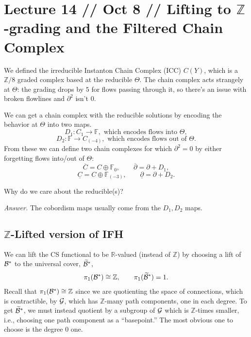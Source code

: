 \documentclass[main]{subfiles}
\begin{document}
\section*{Lecture 14 // Oct 8 // Lifting to $\mathbb{Z}$-grading and the Filtered Chain Complex}

\begin{recall}
We defined the irreducible Instanton Chain Complex (ICC) $C(Y)$, which is a $\mathbb{Z}/8$ graded complex based at the reducible $\Theta$. The chain complex acts strangely at $\Theta$: the grading drops by $5$ for flows passing through it, so there's an issue with broken flowlines and $\partial^2$ isn't $0$.

We can get a chain complex with the reducible solutions by encoding the behavior at $\Theta$ into two maps.
\[
D_1 : C_1 \to \mathbb{F}, \text{ which encodes flows into } \Theta,
\]
\[
D_2 : \mathbb{F} \to C_{(-4)}, \text{ which encodes flows out of } \Theta.
\]
From these we can define two chain complexes for which $\partial^2=0$ by either forgetting flows into/out of $\Theta$:
\[
\overline{C} = C\oplus \mathbb{F}_0, \qquad \overline{\partial} = \partial + D_1,
\]
\[
\underline{C} = C\oplus \mathbb{F}_{(-3)}, \qquad \underline{\partial} = \partial + D_2.
\]
\end{recall}

\begin{question}
Why do we care about the reducible(s)?
\end{question}
\noindent\textit{Answer.} The cobordism maps usually come from the $D_1, D_2$ maps.

\subsection*{$\mathbb{Z}$-Lifted version of IFH}

We can lift the CS functional to be $\mathbb{R}$-valued (instead of $\mathbb{Z}$) by choosing a lift of $\mathcal{B}^\ast$ to the universal cover, $\widetilde{\mathcal{B}}^\ast$,
\[
\pi_1(\mathcal{B}^\ast) \cong \mathbb{Z}, \qquad \pi_1(\widetilde{\mathcal{B}}^\ast) = 1.
\]
Recall that $\pi_1(\mathcal{B}^\ast)\cong \mathbb{Z}$ since we are quotienting the space of connections, which is contractible, by $\mathcal{G}$, which has $\mathbb{Z}$-many path components, one in each degree. To get $\widetilde{\mathcal{B}}^\ast$, we must instead quotient by a subgroup of $\mathcal{G}$ which is $\mathbb{Z}$-times smaller, i.e., choosing one path component as a ``basepoint.'' The most obvious one to choose is the degree $0$ one.
\end{document}
